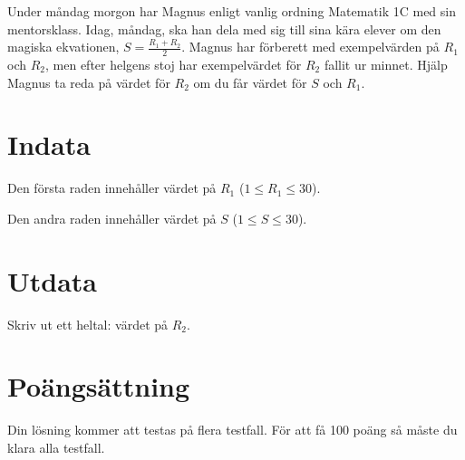 Under måndag morgon har Magnus enligt vanlig ordning Matematik 1C med sin mentorsklass.
Idag, måndag, ska han dela med sig till sina kära elever om den magiska ekvationen,
$S=\frac{R_1+R_2}{2}$. Magnus har förberett med exempelvärden på $R_1$ och $R_2$, men
efter helgens stoj har exempelvärdet för $R_2$ fallit ur minnet. Hjälp Magnus ta reda
på värdet för $R_2$ om du får värdet för $S$ och $R_1$.

\section*{Indata}
Den första raden innehåller värdet på $R_1$ ($1 \leq R_1 \leq 30$).

Den andra raden innehåller värdet på $S$ ($1 \leq S \leq 30$).

\section*{Utdata}
Skriv ut ett heltal: värdet på $R_2$.

\section*{Poängsättning}
Din lösning kommer att testas på flera testfall. För att få 100 poäng så måste du klara alla testfall.
